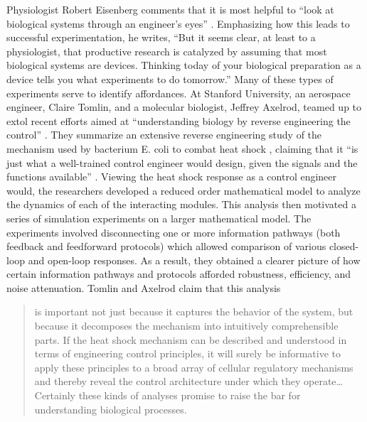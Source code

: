 Physiologist Robert Eisenberg comments that it is most helpful to “look
at biological systems through an engineer’s eyes” \citep[][p.~376]{eisenberg2007}.
Emphasizing how this leads to successful experimentation, he writes,
“But it seems clear, at least to a physiologist, that productive
research is catalyzed by assuming that most biological systems are
devices. Thinking today of your biological preparation as a device
tells you what experiments to do tomorrow.” Many of these types of
experiments serve to identify affordances. At Stanford University, an
aerospace engineer, Claire Tomlin, and a molecular biologist, Jeffrey
Axelrod, teamed up to extol recent efforts aimed at
``understanding biology by reverse engineering the
control'' \citep[][pp. 4219--4220]{tomlinaxelrod2005}. They summarize an extensive reverse
engineering study of the mechanism used by bacterium E. coli to combat
heat shock , claiming that it “is just what a
well-trained control engineer would design, given the signals and the
functions available” \citep[][4219]{tomlinaxelrod2005}. Viewing the heat shock response as a control
engineer would, the researchers developed a reduced order mathematical
model to analyze the dynamics of each of the interacting modules. This
analysis then motivated a series of simulation experiments on a larger
mathematical model. The experiments involved disconnecting one or more
information pathways (both feedback and feedforward protocols) which
allowed comparison of various closed-loop and open-loop responses. As a
result, they obtained a clearer picture of how certain information
pathways and protocols afforded robustness, efficiency, and noise
attenuation. Tomlin and Axelrod claim that this analysis 

\begin{quote}
is important
not just because it captures the behavior of the system, but because it
decomposes the mechanism into intuitively comprehensible parts. If the
heat shock mechanism can be described and understood in terms of
engineering control principles, it will surely be informative to apply
these principles to a broad array of cellular regulatory mechanisms and
thereby reveal the control architecture under which they
operate{\ldots}Certainly these kinds of analyses promise to raise the bar for
understanding biological processes.
\end{quote}

